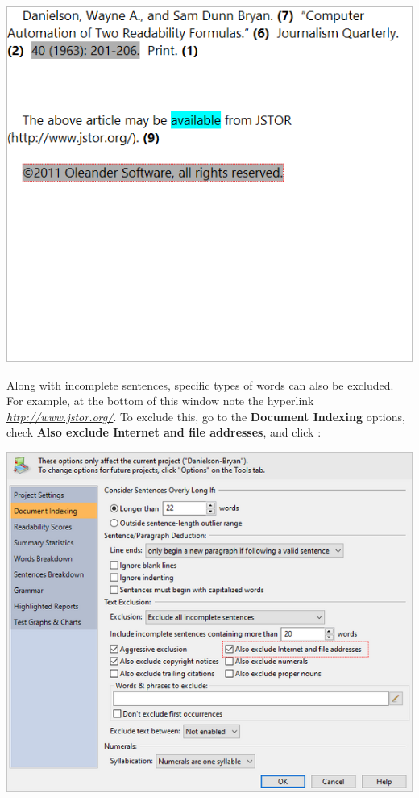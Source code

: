 \documentclass[
]{book}
\theoremstyle{definition}
\theoremstyle{definition}
\theoremstyle{definition}
\theoremstyle{definition}
\theoremstyle{remark}
\begin{document}
\includegraphics{Images/ExclusionExampleCopyrightExcludedNow.png}

Along with incomplete sentences, specific types of words can also be excluded. For example, at the bottom of this window note the hyperlink \emph{\url{http://www.jstor.org/}}. To exclude this, go to the \textbf{Document Indexing} options, check \textbf{Also exclude Internet and file addresses}, and click :

\includegraphics{Images/ExclusionExampleUrlExcluded.png}
\end{document}
